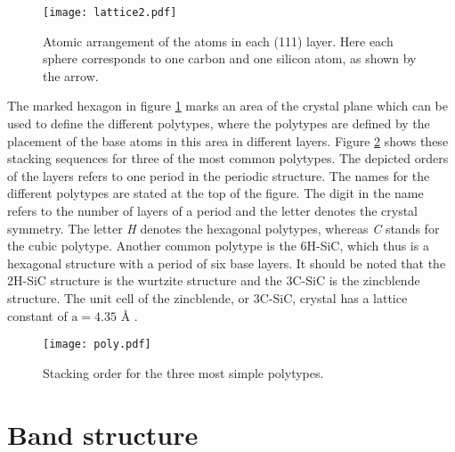 \begin{figure}[h]
\begin{center}
\texttt{[image: lattice2.pdf]}
\caption{Atomic arrangement of the atoms in each (111) layer. Here each sphere corresponds to one carbon and one silicon atom, as shown by the arrow. 
\label{fig:hex}}
\end{center}
\end{figure}

The marked hexagon in figure \ref{fig:hex} marks an area of the crystal plane which can be used to define the different polytypes, where the polytypes are defined by the placement of the base atoms in this area in different layers. Figure \ref{fig:poly} shows these stacking sequences for three of the most common polytypes. The depicted orders of the layers refers to one period in the periodic structure. The names for the different polytypes are stated at the top of the figure. The digit in the name refers to the number of layers of a period and the letter denotes the crystal symmetry. The letter \emph{H} denotes the hexagonal polytypes, whereas \emph{C} stands for the cubic polytype. Another common polytype is the 6H-SiC, which thus is a hexagonal structure with a period of six base layers. It should be noted that the 2H-SiC structure is the wurtzite structure and the 3C-SiC is the zincblende structure. The unit cell of the zincblende, or 3C-SiC, crystal has a lattice constant of $\mathrm{a} = 4.35$ Å \cite{Bimberg1981}. 




\begin{figure}[h]
\begin{center}
\texttt{[image: poly.pdf]}
\caption{Stacking order for the three most simple polytypes. 
\label{fig:poly}}
\end{center}
\end{figure}

\section{Band structure}
\label{sec:band_structure}

